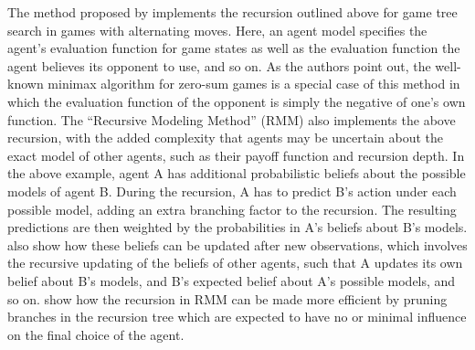 \documentclass[final,1p,times,authoryear]{elsarticle}
\begin{document}
The method proposed by \citet{cm1996search} implements the recursion outlined above for game tree search in games with alternating moves. Here, an agent model specifies the agent's evaluation function for game states as well as the evaluation function the agent believes its opponent to use, and so on. As the authors point out, the well-known minimax algorithm for zero-sum games \citep{cm1983} is a special case of this method in which the evaluation function of the opponent is simply the negative of one's own function. The ``Recursive Modeling Method'' (RMM) \citep{gd2000,gd1995,gdw1991} also implements the above recursion, with the added complexity that agents may be uncertain about the exact model of other agents, such as their payoff function and recursion depth. In the above example, agent A has additional probabilistic beliefs about the possible models of agent B. During the recursion, A has to predict B's action under each possible model, adding an extra branching factor to the recursion. The resulting predictions are then weighted by the probabilities in A's beliefs about B's models. \citet{gnk1998} also show how these beliefs can be updated after new observations, which involves the recursive updating of the beliefs of other agents, such that A updates its own belief about B's models, and B's expected belief about A's possible models, and so on. \citet{vd1995} show how the recursion in RMM can be made more efficient by pruning branches in the recursion tree which are expected to have no or minimal influence on the final choice of the agent.
\end{document}
